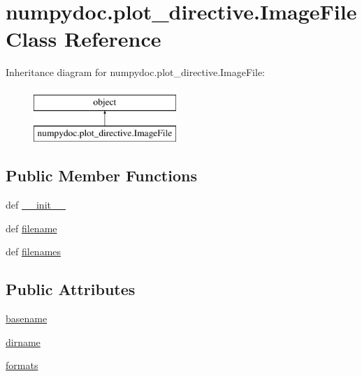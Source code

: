 \hypertarget{classnumpydoc_1_1plot__directive_1_1ImageFile}{}\section{numpydoc.\+plot\+\_\+directive.\+Image\+File Class Reference}
\label{classnumpydoc_1_1plot__directive_1_1ImageFile}
Inheritance diagram for numpydoc.\+plot\+\_\+directive.\+Image\+File\+:\begin{figure}[H]
\begin{center}
\leavevmode
\includegraphics[height=2.000000cm]{classnumpydoc_1_1plot__directive_1_1ImageFile}
\end{center}
\end{figure}
\subsection*{Public Member Functions}
\begin{DoxyCompactItemize}
\item 
def \hyperlink{classnumpydoc_1_1plot__directive_1_1ImageFile_a5b1b45fb336987c67ec7788c91120ed7}{\+\_\+\+\_\+init\+\_\+\+\_\+}
\item 
def \hyperlink{classnumpydoc_1_1plot__directive_1_1ImageFile_a504d20f3e256e2385b97af4f36e54a8e}{filename}
\item 
def \hyperlink{classnumpydoc_1_1plot__directive_1_1ImageFile_a23a9bea359c02f12d731fb4cd899d64a}{filenames}
\end{DoxyCompactItemize}
\subsection*{Public Attributes}
\begin{DoxyCompactItemize}
\item 
\hyperlink{classnumpydoc_1_1plot__directive_1_1ImageFile_a825faa339f4fe51009ee4351a2da158f}{basename}
\item 
\hyperlink{classnumpydoc_1_1plot__directive_1_1ImageFile_a68528edd6bd299dca4c77caf8f936d78}{dirname}
\item 
\hyperlink{classnumpydoc_1_1plot__directive_1_1ImageFile_aa0999f1f87769b57abc9cc4d57565e03}{formats}
\end{DoxyCompactItemize}


